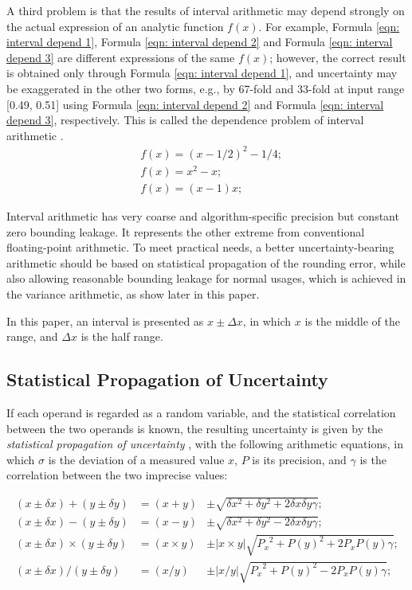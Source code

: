 \documentclass[twoside]{article}
\numberwithin{equation}{section}
\begin{document}
A third problem is that the results of interval arithmetic may depend strongly on the actual expression of an analytic function $f(x)$.  
For example, Formula \eqref{eqn: interval depend 1}, Formula \eqref{eqn: interval depend 2} and Formula \eqref{eqn: interval depend 3} are different expressions of the same $f(x)$; however, the correct result is obtained only through Formula \eqref{eqn: interval depend 1}, and uncertainty may be exaggerated in the other two forms, e.g., by 67-fold and 33-fold at input range [0.49, 0.51] using Formula \eqref{eqn: interval depend 2} and Formula \eqref{eqn: interval depend 3}, respectively.  
This is called the dependence problem of interval arithmetic \cite{Interval_Arithmetic}.  
\begin{align}
\label{eqn: interval depend 1} & 
f(x) = (x - 1/2)^{2} - 1/4; \\
\label{eqn: interval depend 2} & 
f(x) = x^{2} - x; \\
\label{eqn: interval depend 3} & 
f(x) = (x - 1) x;
\end{align}

Interval arithmetic has very coarse and algorithm-specific precision but constant zero bounding leakage.  
It represents the other extreme from conventional floating-point arithmetic.  
To meet practical needs, a better uncertainty-bearing arithmetic should be based on statistical propagation of the rounding error, while also allowing reasonable bounding leakage for normal usages, which is achieved in the variance arithmetic, as show later in this paper.

In this paper, an interval is presented as $x \pm \Delta x$, in which $x$ is the middle of the range, and $\Delta x$ is the half range.


\subsection{Statistical Propagation of Uncertainty}

If each operand is regarded as a random variable, and the statistical correlation between the two operands is known, the resulting uncertainty is given by the \emph{statistical propagation of uncertainty} \cite{Statistical_Arithmetic}\cite{Statistical_Analysis}, with the following arithmetic equations, in which $\sigma$ is the deviation of a measured value $x$, $P$ is its precision, and $\gamma$ is the correlation between the two imprecise values:

\begin{align}
\label{eqn: stat +} 
(x \pm \delta x) + (y \pm \delta y) & = (x + y) & \pm \sqrt{\delta x^{2} + \delta y^{2} + 2 \delta x \delta y \gamma}; \\
\label{eqn: stat -} 
(x \pm \delta x) - (y \pm \delta y) & = (x - y) & \pm \sqrt{\delta x^{2} + \delta y^{2} - 2 \delta x \delta y \gamma}; \\
\label{eqn: stat *} 
(x \pm \delta x) \times (y \pm \delta y) & = (x \times y) & \pm |x \times y| \sqrt{{P_x}^2 + {P(y)}^2 + 2 P_x P(y) \gamma}; \\
\label{eqn: stat /} 
(x \pm \delta x) / (y \pm \delta y) & = (x/y) & \pm |x / y| \sqrt{{P_x}^2 + {P(y)}^2 - 2 P_x P(y) \gamma};
\end{align}
\end{document}
